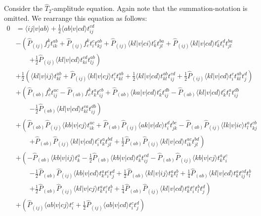 Consider the $\hat{T}_2$-amplitude equation. Again note that the summation-notation is omitted. We rearrange this equation as follows:
\begin{align} 
0&=\langle ij|v|ab\rangle+\frac{1}{2}\langle ab|v|cd\rangle t_{ij}^{cd}\\
&-\left( \hat{P}_{(ij)}f_j^kt_{ik}^{ab}+\hat{P}_{(ij)}f_c^kt_i^ct_{kj}^{ab}+\hat{P}_{(ij)}\langle kl|v|ci\rangle t_k^ct_{jl}^{ba}+\hat{P}_{(ij)}\langle kl|v|cd\rangle t_k^ct_i^dt_{jl}^{ba}\right.\\
&\phantom{++}\left.+\frac{1}{2}\hat{P}_{(ij)}\langle kl|v|cd\rangle t_{ki}^{cd}t_{lj}^{ab}\right)\\
&+\frac{1}{2}\left(\langle kl|v|ij\rangle t_{kl}^{ab}+\hat{P}_{(ij)}\langle kl|v|cj\rangle t_i^ct_{kl}^{ab}+\frac{1}{2}\langle kl|v|cd\rangle t_{kl}^{ab}t_{ij}^{cd}+\frac{1}{2}\hat{P}_{(ij)}\langle kl|v|cd\rangle t_i^ct_{kl}^{ab}t_j^d\right)\\
&+\left(\hat{P}_{(ab)}f_c^bt_{ij}^{ac}-\hat{P}_{(ab)}f_c^kt_k^at_{ij}^{cb}+\hat{P}_{(ab)}\langle ka|v|cd\rangle t_k^ct_{ij}^{db}-\hat{P}_{(ab)}\langle kl|v|cd\rangle t_k^ct_l^at_{ij}^{db}\right.\\
&\phantom{++}\left.-\frac{1}{2}\hat{P}_{(ab)}\langle kl|v|cd\rangle t_{kl}^{ca}t_{ij}^{db}\right)\\
&+\left(\hat{P}_{(ab)}\hat{P}_{(ij)}\langle kb|v|cj\rangle t_{ik}^{ac}+\hat{P}_{(ab)}\hat{P}_{(ij)}\langle ak|v|dc\rangle t_i^dt_{jk}^{bc}-\hat{P}_{(ab)}\hat{P}_{(ij)}\langle lk|v|ic\rangle t_l^at_{kj}^{cb}\right.\\
&\phantom{++}\left.+\hat{P}_{(ab)}\hat{P}_{(ij)}\langle kl|v|cd\rangle t_i^ct_k^at_{jl}^{bd}+\frac{1}{2}\hat{P}_{(ab)}\hat{P}_{(ij)}\langle kl|v|cd\rangle t_{ik}^{ac}t_{jl}^{bd}\right)\\
&+\left(-\hat{P}_{(ab)}\langle kb|v|ij\rangle t_k^a-\frac{1}{2}\hat{P}_{(ab)}\langle kb|v|cd\rangle t_k^at_{ij}^{cd}-\hat{P}_{(ab)}\hat{P}_{(ij)}\langle kb|v|cj\rangle t_k^at_i^c\right.\\
&\phantom{++}\left.-\frac{1}{2}\hat{P}_{(ab)}\hat{P}_{(ij)}\langle kb|v|cd\rangle t_k^at_i^ct_j^d+\frac{1}{2}\hat{P}_{(ab)}\langle kl|v|ij\rangle t_{k}^{a}t_l^b+\frac{1}{4}\hat{P}_{(ab)}\langle kl|v|cd\rangle t_k^at_{ij}^{cd}t_l^b\right.\\
&\phantom{++}\left.+\frac{1}{2}\hat{P}_{(ab)}\hat{P}_{(ij)}\langle kl|v|cj\rangle t_k^at_i^ct_l^b+\frac{1}{4}\hat{P}_{(ab)}\hat{P}_{(ij)}\langle kl|v|cd\rangle t_k^at_i^ct_l^bt_j^d\right)\\
&+\left(\hat{P}_{(ij)}\langle ab|v|cj\rangle t_i^c+\frac{1}{2}\hat{P}_{(ij)}\langle ab|v|cd\rangle t_i^ct_j^d\right)
\label{eq:impl:t2amplitude}
\end{align}
